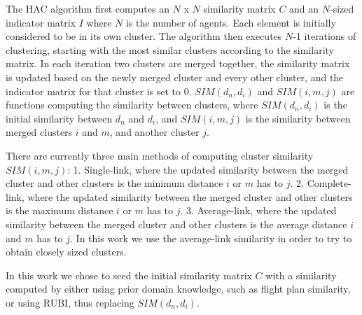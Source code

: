\documentclass[onehalf,11pt]{beavtex}
\begin{document}
The HAC algorithm first computes an $N$ x $N$ similarity matrix $C$ and an $N$-sized indicator matrix $I$ where $N$ is the number of agents. Each element is initially considered to be in its own cluster. The algorithm then executes $N$-1 iterations of clustering, starting with the most similar clusters according to the similarity matrix. In each iteration two clusters are merged together, the similarity matrix is updated based on the newly merged cluster and every other cluster, and the indicator matrix for that cluster is set to 0. $SIM(d_n, d_i)$ and $SIM(i,m,j)$ are functions computing the similarity between clusters, where $SIM(d_n, d_i)$ is the initial similarity between $d_n$ and $d_i$, and $SIM(i,m,j)$ is the similarity between merged clusters $i$ and $m$, and another cluster $j$.

There are currently three main methods of computing cluster similarity $SIM(i,m,j)$: 1. Single-link, where the updated similarity between the merged cluster and other clusters is the minimum distance $i$ or $m$ has to $j$. 2. Complete-link, where the updated similarity between the merged cluster and other clusters is the maximum distance $i$ or $m$ has to $j$. 3. Average-link, where the updated similarity between the merged cluster and other clusters is the average distance $i$ and $m$ has to $j$. In this work we use the average-link similarity in order to try to obtain closely sized clusters.

In this work we chose to seed the initial similarity matrix $C$ with a similarity computed by either using prior domain knowledge, such as flight plan similarity, or using RUBI, thus replacing $SIM(d_n, d_i)$.

\end{document}
